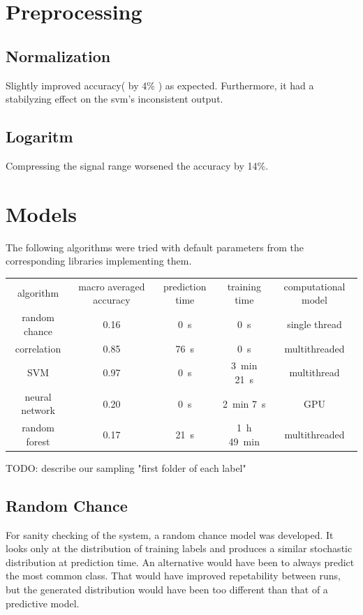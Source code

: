 \documentclass{article}
\begin{document}
\section{Preprocessing}
\subsection{Normalization}
Slightly improved accuracy( by 4\% ) as expected.
Furthermore, it had a stabilyzing effect on the svm's inconsistent output.


\subsection{Logaritm}
Compressing the signal range worsened the accuracy by 14\%.


\section{Models}
The following algorithms were tried with default parameters from the corresponding libraries implementing them.
\\ \par
{}
\begin{tabular}{ c | c | c | c | c }
algorithm      & macro averaged accuracy & prediction time  & training time                    & computational model \\
random chance  & 0.16                    & \SI{0}{\second}  & \SI{0}{\second}                  & single thread \\
correlation    & 0.85                    & \SI{76}{\second} & \SI{0}{\second}                  & multithreaded \\
SVM            & 0.97                    & \SI{0}{\second}  & \SI{3}{\minute} \SI{21}{\second} & multithread \\
neural network & 0.20                    & \SI{0}{\second}  & \SI{2}{\minute} \SI{7}{\second}  & GPU \\  %
random forest  & 0.17                    & \SI{21}{\second} & \SI{1}{\hour} \SI{49}{\minute}   & multithreaded \\  %
\end{tabular}
TODO: describe our sampling "first folder of each label"

\subsection{Random Chance}
For sanity checking of the system, a random chance model was developed.
It looks only at the distribution of training labels and produces a similar stochastic distribution at prediction time.
An alternative would have been to always predict the most common class.
That would have improved repetability between runs, but the generated distribution would have been too different than that of a predictive model.
\end{document}
